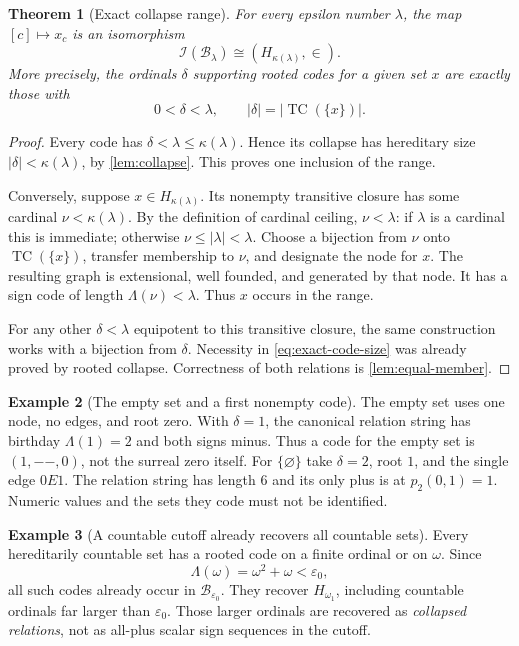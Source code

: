 \documentclass[11pt,letterpaper]{article}
\newtheorem{theorem}{Theorem}[section]
\theoremstyle{definition}
\newtheorem{example}[theorem]{Example}
\theoremstyle{remark}
\newcommand{\TC}{\operatorname{TC}}
\newcommand{\B}{\mathcal B}
\newcommand{\I}{\mathcal I}
\newcommand{\card}[1]{\lvert#1\rvert}
\newcommand{\ceilcard}[1]{\kappa(#1)}
\begin{document}
\begin{theorem}[Exact collapse range]
\label{thm:collapse-range}
For every epsilon number $\lambda$, the map $[c]\mapsto x_c$ is an
isomorphism
\[
 \I(\B_\lambda)\cong(H_{\ceilcard{\lambda}},\in).
\]
More precisely, the ordinals $\delta$ supporting rooted codes for a given
set $x$ are exactly those with
\[
 0<\delta<\lambda,
 \qquad\card\delta=\card{\TC(\{x\})}.
 \label{eq:exact-code-size}
\]
\end{theorem}
\begin{proof}
Every code has $\delta<\lambda\le\kappa(\lambda)$. Hence its collapse has
hereditary size $\card\delta<\kappa(\lambda)$, by
\cref{lem:collapse}. This proves one inclusion of the range.

Conversely, suppose $x\in H_{\kappa(\lambda)}$. Its nonempty transitive
closure has some cardinal $\nu<\kappa(\lambda)$. By the definition of
cardinal ceiling, $\nu<\lambda$: if $\lambda$ is a cardinal this is
immediate; otherwise $\nu\le\card\lambda<\lambda$. Choose a bijection from
$\nu$ onto $\TC(\{x\})$, transfer membership to $\nu$, and designate the
node for $x$. The resulting graph is extensional, well founded, and generated
by that node. It has a sign code of length $\Lambda(\nu)<\lambda$.
Thus $x$ occurs in the range.

For any other $\delta<\lambda$ equipotent to this transitive closure, the
same construction works with a bijection from $\delta$. Necessity in
\eqref{eq:exact-code-size} was already proved by rooted collapse. Correctness
of both relations is \cref{lem:equal-member}.
\end{proof}

\begin{example}[The empty set and a first nonempty code]
The empty set uses one node, no edges, and root zero. With $\delta=1$, the
canonical relation string has birthday $\Lambda(1)=2$ and both signs minus.
Thus a code for the empty set is $(1,--,0)$, not the surreal zero itself.
For $\{\varnothing\}$ take $\delta=2$, root $1$, and the single edge
$0E1$. The relation string has length $6$ and its only plus is at
$p_2(0,1)=1$. Numeric values and the sets they code must not be identified.
\end{example}

\begin{example}[A countable cutoff already recovers all countable sets]
Every hereditarily countable set has a rooted code on a finite ordinal or
on $\omega$. Since
\[
 \Lambda(\omega)=\omega^2+\omega<\varepsilon_0,
\]
all such codes already occur in $\B_{\varepsilon_0}$. They recover
$H_{\omega_1}$, including countable ordinals far larger than
$\varepsilon_0$. Those larger ordinals are recovered as \emph{collapsed
relations}, not as all-plus scalar sign sequences in the cutoff.
\end{example}
\end{document}
